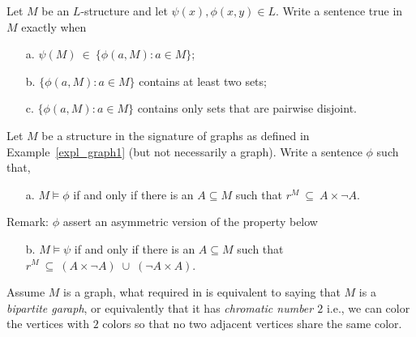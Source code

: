 
\bigskip

\smallskip

\begin{exercise}
Let $M$ be an $L$-structure and let $\psi(x), \phi(x,y)\in L$. Write a sentence true in $M$ exactly when
\begin{itemize}
\item[a.] $\psi(M)\ \in\ \{\phi(a,M): a\in M\}$;
\item[b.] $\{\phi(a,M): a\in M\}$ contains at least two sets;
\item[c.] $\{\phi(a,M): a\in M\}$ contains only sets that are pairwise disjoint.\QED
\end{itemize}
\end{exercise}

\begin{exercise}\label{ex_grafo_bipartito}
Let $M$ be a structure in the signature of graphs as defined in Example~\ref{expl_graph1} (but not necessarily a graph). Write a sentence $\phi$ such that, 
\begin{itemize} 
\item[a.] $M\models\phi$ if and only if there is an $A\subseteq M$ such that $r^M\ \subseteq\ A\times\neg A$.
\end{itemize}
Remark: $\phi$ assert an asymmetric version of the property below
\begin{itemize} 
\item[b.] $M\models\psi$ if and only if there is an $A\subseteq M$ such that $r^M\ \subseteq\ (A\times \neg A)\;\cup\;(\neg A\times A)$.
\end{itemize}
Assume $M$ is a graph, what required in  is equivalent to saying that $M$ is a \textit{bipartite garaph}, or equivalently that it has \textit{chromatic number $2$\/} i.e., we can color the vertices with $2$ colors so that no two adjacent vertices share the same color.\QED
\end{exercise}


